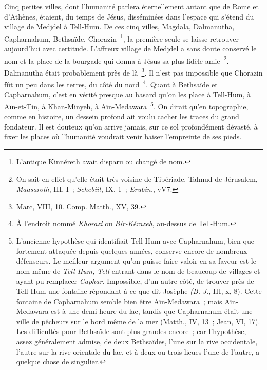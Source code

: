 \documentclass[french,twoside]{book} %
\begin{document}
Cinq petites villes, dont l’humanité parlera éternellement autant que de Rome et d’Athènes, étaient, du temps de Jésus, disséminées dans l’espace qui s’étend du village de Medjdel à Tell-Hum. De ces cinq villes, Magdala, Dalmanutha, Capharnahum, Bethsaïde, Chorazin \footnote{L’antique Kinnéreth avait disparu ou changé de nom.}, la première seule se laisse retrouver aujourd’hui avec certitude. L’affreux village de Medjdel a sans doute conservé le nom et la place de la bourgade qui donna à Jésus sa plus fidèle amie \footnote{ On sait en effet qu’elle était très voisine de Tibériade. Talmud de Jérusalem, {\itshape Maasaroth}, III, I ; {\itshape Schebiit}, IX, 1 ; {\itshape Erubin.}, vV7.}. Dalmanutha était probablement près de là \footnote{Marc, VIII, 10. Comp. Matth., XV, 39.}. Il n’est pas impossible que Chorazin fût un peu dans les terres, du côté du nord \footnote{ À l’endroit nommé {\itshape Khorazi} ou {\itshape Bir-Kérazeh}, au-dessus de Tell-Hum.}. Quant à Bethsaïde et Capharnahum, c’est en vérité presque au hasard qu’on les place à Tell-Hum, à Aïn-et-Tin, à Khan-Minyeh, à Aïn-Medawara \footnote{ L’ancienne hypothèse qui identifiait Tell-Hum avec Capharnahum, bien que fortement attaquée depuis quelques années, conserve encore de nombreux défenseurs. Le meilleur argument qu’on puisse faire valoir en sa faveur est le nom même de {\itshape Tell-Hum, Tell} entrant dans le nom de beaucoup de villages et ayant pu remplacer {\itshape Caphar}. Impossible, d’un autre côté, de trouver près de Tell-Hum une fontaine répondant à ce que dit Josèphe {\itshape (B. J}., III, x, 8). Cette fontaine de Capharnahum semble bien être Aïn-Medawara ; mais Aïn-Medawara est à une demi-heure du lac, tandis que Capharnahum était une ville de pêcheurs sur le bord même de la mer (Matth., IV, 13 ; Jean, VI, 17). Les difficultés pour Bethsaïde sont plus grandes encore ; car l’hypothèse, assez généralement admise, de deux Bethsaïdes, l’une sur la rive occidentale, l’autre sur la rive orientale du lac, et à deux ou trois lieues l’une de l’autre, a quelque chose de singulier.}. On dirait qu’en topographie, comme en histoire, un dessein profond ait voulu cacher les traces du grand fondateur. Il est douteux qu’on arrive jamais, sur ce sol profondément dévasté, à fixer les places où l’humanité voudrait venir baiser l’empreinte de ses pieds.\par
\end{document}
